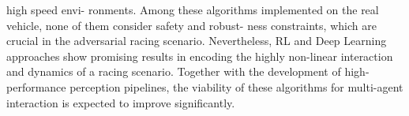 high speed envi- ronments. Among these algorithms implemented on the real vehicle, none of them consider safety and robust- ness constraints, which are crucial in the adversarial racing scenario. Nevertheless, RL and Deep Learning approaches show promising results in encoding the highly non-linear interaction and dynamics of a racing scenario. Together with the development of high-performance perception pipelines, the viability of these algorithms for multi-agent interaction is expected to improve significantly.
\cite{johan22}


\cite{deepLearning19}


\cite{softwareArch19}


\cite{indyChallange22}


\cite{TUM23}


\cite{AMZ20}